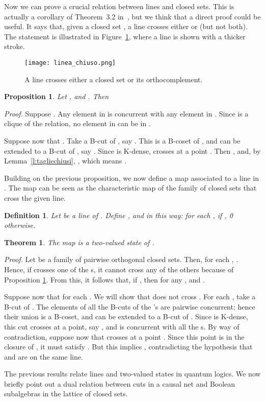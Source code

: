 \documentclass{eptcs}
\newenvironment{proof}{\textit{Proof.}\quad}{\par\vspace{\baselineskip}\relax}
\newtheorem{definition}{Definition}
\newtheorem{proposition}{Proposition}
\newtheorem{theorem}{Theorem}
\begin{document}
Now we can prove a crucial relation between lines and closed sets.
This is actually a corollary of Theorem~3.2 in~\cite{BPR10}, but
we think that a direct proof could be useful. It says that, given
a closed set , a line crosses either  or  (but not both).
The statement is illustrated in Figure~\ref{f:linea_chiuso}, where
a line is shown with a thicker stroke.
\begin{figure}
  \begin{center}
\texttt{[image: linea\_chiuso.png]}
  \end{center}
  \caption{A line crosses either a closed set or its orthocomplement.}\label{f:linea_chiuso}
\end{figure}
\begin{proposition}\label{p:lmeetsc}
  Let , and .
  Then
  
\end{proposition}
\begin{proof}
  Suppose . Any element in  is
  concurrent with any element in . Since  is a clique
  of the  relation, no element in  can be in .

  Suppose now that . Take a B-cut of ,
  say . This is a B-coset of , and can be extended to a
  B-cut of , say . Since  is K-dense,  crosses
   at a point . Then , and,
  by Lemma~\ref{l:tagliechiusi}, , which means .
\end{proof}
Building on the previous proposition, we now define a map associated to
a line in . The map can be seen as the characteristic map of
the family of closed sets that cross the given line.
\begin{definition}
  Let  be a line of . Define
  ,
  and  in this way:
  for each ,  if
  , 0 otherwise.
\end{definition}
\begin{theorem}\label{t:line_2vs}
  The map  is a two-valued state of .
\end{theorem}
\begin{proof}
  Let  be a family of pairwise orthogonal closed sets.
  Then, for each , . Hence, if
   crosses one of the s, it cannot cross any of the
  others because of Proposition \ref{p:lmeetsc}.
  From this, it follows that,
  if , then 
  for any , and .

  Suppose now that  for each .
  We will show that  does not cross .
  For each , take a B-cut of . The elements of all the
  B-cuts of the 's are pairwise
  concurrent; hence their union is a B-coset, and can be extended to
  a B-cut of . Since  is K-dense, this cut crosses  at
  a point, say , and  is concurrent with all the s.
  By way of contradiction, suppose now that
   crosses  at a point . Since this point is
  in the closure of , it must satisfy .
  But this implies , contradicting the hypothesis that 
  and  are on the same line.
\end{proof}
The previous results relate lines and two-valued states in
quantum logics. We now briefly point out a dual relation
between cuts in a causal net and Boolean subalgebras in the
lattice of closed sets.
\end{document}
